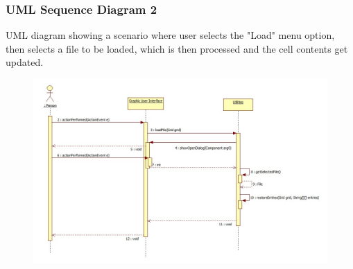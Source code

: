 \documentclass[12pt]{article}
\begin{document}
\subsubsection{UML Sequence Diagram 2}
UML diagram showing a scenario where user selects the "Load" menu option, then selects a file to be loaded, which is then processed and the cell contents get updated.
\begin{figure}[ht!]
\centering
\includegraphics[width=180mm]{SequenceDiagram2.jpg}
\end{figure}
\end{document}

